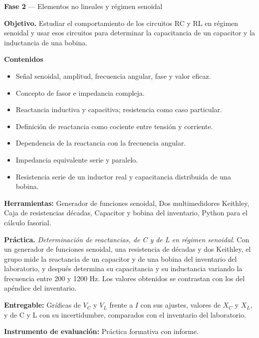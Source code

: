 \documentclass[11pt,a4paper]{article}
\begin{document}
\begin{tcolorbox}[cajaContenido,title={Semana 6 --- Respuesta de R, L y C a la tensión senoidal}]
\textbf{Fase 2} --- Elementos no lineales y régimen senoidal

\textbf{Objetivo.} Estudiar el comportamiento de los circuitos RC y RL en régimen senoidal y usar esos circuitos para determinar la capacitancia de un capacitor y la inductancia de una bobina.

\textbf{Contenidos}

\begin{itemize}[leftmargin=1.4em,itemsep=2pt,topsep=3pt]
  \item Señal senoidal, amplitud, frecuencia angular, fase y valor eficaz.
  \item Concepto de fasor e impedancia compleja.
  \item Reactancia inductiva y capacitiva; resistencia como caso particular.
  \item Definición de reactancia como cociente entre tensión y corriente.
  \item Dependencia de la reactancia con la frecuencia angular.
  \item Impedancia equivalente serie y paralelo.
  \item Resistencia serie de un inductor real y capacitancia distribuida de una bobina.
\end{itemize}

\textbf{Herramientas:} Generador de funciones senoidal, Dos multimedidores Keithley, Caja de resistencias décadas, Capacitor y bobina del inventario, Python para el cálculo fasorial.

\textbf{Práctica.} \emph{Determinación de reactancias, de C y de L en régimen senoidal}. Con un generador de funciones senoidal, una resistencia de décadas y dos Keithley, el grupo mide la reactancia de un capacitor y de una bobina del inventario del laboratorio, y después determina su capacitancia y su inductancia variando la frecuencia entre 200 y 1200 Hz. Los valores obtenidos se contrastan con los del apéndice del inventario.

\textbf{Entregable:} Gráficas de $V_C$ y $V_L$ frente a $I$ con sus ajustes, valores de $X_C$ y $X_L$, y de C y L con su incertidumbre, comparados con el inventario del laboratorio.

\textbf{Instrumento de evaluación:} Práctica formativa con informe.
\end{tcolorbox}
\end{document}
